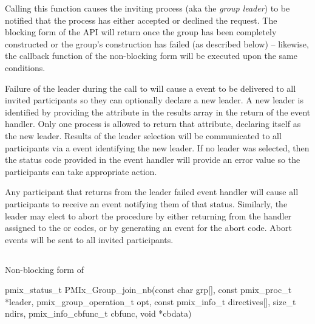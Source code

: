 Calling this function causes the inviting process (aka the \emph{group leader}) to be notified that the process has either accepted or declined the request. The blocking form of the \ac{API} will return once the group has been completely constructed or the group’s construction has failed (as described below) – likewise, the callback function of the non-blocking form will be executed upon the same conditions.

Failure of the leader during the call to  will cause a  event to be delivered to all invited participants so they can optionally declare a new leader. A new leader is identified by providing the  attribute in the results array in the return of the event handler. Only one process is allowed to return that attribute, declaring itself as the new leader. Results of the leader selection will be communicated to all participants via a  event identifying the new leader. If no leader was selected, then the status code provided in the event handler will provide an error value so the participants can take appropriate action.

Any participant that returns  from the leader failed event handler will cause all participants to receive an event notifying them of that status. Similarly, the leader may elect to abort the procedure by either returning  from the handler assigned to the  or  codes, or by generating an event for the abort code. Abort events will be sent to all invited participants.


\subsection{}

\summary

Non-blocking form of 

\format

\cspecificstart
\begin{codepar}
pmix_status_t
PMIx_Group_join_nb(const char grp[],
                   const pmix_proc_t *leader,
                   pmix_group_operation_t opt,
                   const pmix_info_t directives[], size_t ndirs,
                   pmix_info_cbfunc_t cbfunc, void *cbdata)
\end{codepar}
\cspecificend

